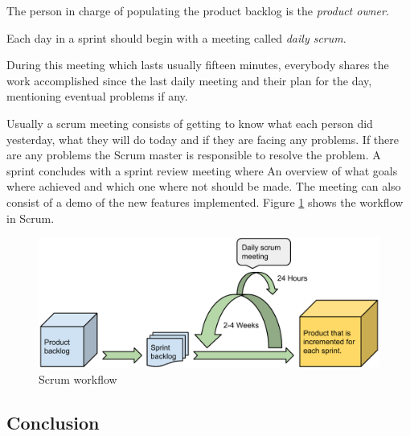 The person in charge of populating the product backlog is the \emph{product owner}.

Each day in a sprint should begin with a meeting called \emph{daily scrum}.

During this meeting which lasts usually fifteen minutes, everybody shares the work
accomplished since the last daily meeting and their plan for the day, mentioning eventual
problems if any.

 
Usually a scrum meeting consists of getting to know what each person did yesterday,
what they will do today and if they are facing any problems.
If there are any problems the Scrum master is responsible to resolve the problem.
A sprint concludes with a sprint review meeting where 
An overview of what goals where achieved and which one where not should be made.
The meeting can also consist of a demo of the new features implemented. 
Figure \ref{figure:scrum-workflow} shows the workflow in Scrum.

\begin{figure}[h]
\begin{center}
\includegraphics[scale=0.5]{../Figures/Scrum-workflow.pdf}
\end{center}
\caption{Scrum workflow}
\label{figure:scrum-workflow}
\end{figure}

\subsection{Conclusion}

